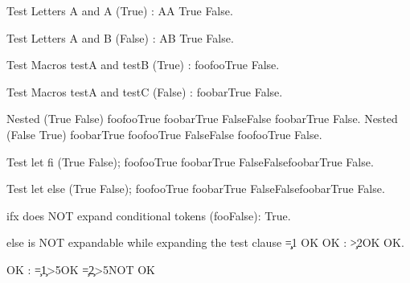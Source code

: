 \documentclass{article}
\begin{document}
\def\testA{foo}
\def\testB{foo}
\def\testC{bar}

Test Letters A and A (True) : \ifx AA True \else False\fi.

Test Letters A and B (False) : \ifx AB True \else False\fi.

Test Macros testA and testB (True) : \ifx\testA\testB True \else False\fi.

Test Macros testA and testC (False) : \ifx\testA\testC True \else False\fi.

Nested (True False)
\ifx\testA\testB True \ifx\testA\testC True \else False\fi \else False \ifx\testA\testC True \else False\fi\fi.
Nested (False True)
\ifx\testA\testC True \ifx\testA\testB True \else False\fi \else False \ifx\testA\testB True \else False\fi\fi.

\let\endif\fi
Test let fi (True False); 
\ifx\testA\testB True \ifx\testA\testC True \else False\endif \else False\ifx\testA\testC True \else False\endif\endif.

\let\otherwise\else
Test let else (True False); 
\ifx\testA\testB True \ifx\testA\testC True \otherwise False\endif \otherwise False\ifx\testA\testC True \otherwise False\endif\endif.


ifx does NOT expand conditional tokens (fooFalse): \ifx\iftrue\testA True\else\testB False\fi.

else is NOT expandable while expanding the test clause
\newcount\c\c=1
OK OK :
\ifnum\c>2\else OK \fi
{}\else OK\fi.

\def\oneorten{1\ifodd\c{}\fi}
OK :
\c=1\relax\ifnum\oneorten>5\else OK \fi
\c=2\relax\ifnum\oneorten>5\else NOT OK\fi
\end{document}
